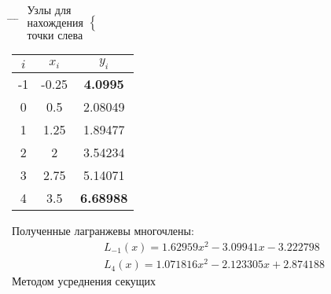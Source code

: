 \documentclass[a4paper, 14pt]{article}
\begin{document}
{\begin{center}
    \begin{tabbing}
    \hspace*{3.5cm}\= \hspace*{3.5cm} \= \hspace*{4.8cm} \= \kill
    \>
    \huge$\begin{smallmatrix}
        \text{Узлы для}\\
        \text{нахождения}\\
        \text{точки слева}
    \end{smallmatrix}
    \begin{cases}
         \\\\
    \end{cases}$
    \>
    \begin{tabular}{|c|c|c|}
        \hline
        $i$ & $x_i$ & $y_i$ \\
        \hline
        -1 & -0.25 & {\bf4.0995} \\
        \hline
        0 & 0.5 & 2.08049 \\
        \hline
        1 & 1.25 & 1.89477 \\
        \hline
        2 & 2 & 3.54234 \\
        \hline
        3 & 2.75 & 5.14071 \\
        \hline
        4 & 3.5 & {\bf6.68988} \\
        \hline
    \end{tabular}
    \>
    \end{tabbing}
\end{center}
Полученные лагранжевы многочлены:
\begin{align}
    &L_{-1}(x) = 1.62959x^2 - 3.09941x - 3.222798\\
    &L_{4}(x) = 1.071816x^2 - 2.123305x + 2.874188
\end{align}
Методом усреднения секущих
}
\end{document}
